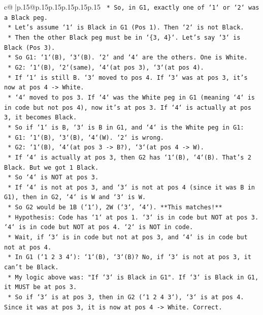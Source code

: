 \documentclass{article}
\begin{document}
{\begin{supertabular}{c@{$\;$}|p{.15\linewidth}@{}p{.15\linewidth}p{.15\linewidth}p{.15\linewidth}p{.15\linewidth}p{.15\linewidth}}
{{{\texttt{    *   So, in G1, exactly one of `1` or `2` was a Black peg.} \\
\texttt{    *   Let's assume `1` is Black in G1 (Pos 1). Then `2` is not Black.} \\
\texttt{        *   Then the other Black peg must be in `\{3, 4\}`. Let's say `3` is Black (Pos 3).} \\
\texttt{        *   So G1: `1`(B), `3`(B). `2` and `4` are the others. One is White.} \\
\texttt{        *   G2: `1`(B), `2`(same), `4`(at pos 3), `3`(at pos 4).} \\
\texttt{        *   If `1` is still B. `3` moved to pos 4. If `3` was at pos 3, it's now at pos 4 {-}> White.} \\
\texttt{        *   `4` moved to pos 3. If `4` was the White peg in G1 (meaning `4` is in code but not pos 4), now it's at pos 3. If `4` is actually at pos 3, it becomes Black.} \\
\texttt{        *   So if `1` is B, `3` is B in G1, and `4` is the White peg in G1:} \\
\texttt{            *   G1: `1`(B), `3`(B), `4`(W). `2` is wrong.} \\
\texttt{            *   G2: `1`(B), `4`(at pos 3 {-}> B?), `3`(at pos 4 {-}> W).} \\
\texttt{            *   If `4` is actually at pos 3, then G2 has `1`(B), `4`(B). That's 2 Black. But we got 1 Black.} \\
\texttt{            *   So `4` is NOT at pos 3.} \\
\texttt{            *   If `4` is not at pos 3, and `3` is not at pos 4 (since it was B in G1), then in G2, `4` is W and `3` is W.} \\
\texttt{            *   So G2 would be 1B (`1`), 2W (`3`, `4`). **This matches!**} \\
\texttt{    *   Hypothesis: Code has `1` at pos 1. `3` is in code but NOT at pos 3. `4` is in code but NOT at pos 4. `2` is NOT in code.} \\
\texttt{    *   Wait, if `3` is in code but not at pos 3, and `4` is in code but not at pos 4.} \\
\texttt{    *   In G1 (`1 2 3 4`): `1`(B), `3`(B)? No, if `3` is not at pos 3, it can't be Black.} \\
\texttt{    *   My logic above was: "If `3` is Black in G1". If `3` is Black in G1, it MUST be at pos 3.} \\
\texttt{    *   So if `3` is at pos 3, then in G2 (`1 2 4 3`), `3` is at pos 4. Since it was at pos 3, it is now at pos 4 {-}> White. Correct.} \\
}}}
\end{supertabular}}
\end{document}

